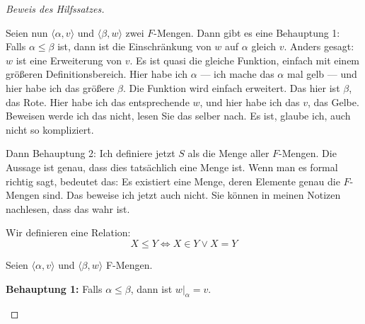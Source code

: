 \begin{proof}[Beweis des Hilfssatzes]
\begin{spoken-clean}[00:46:55 - 00:48:30]
Seien nun $\langle \alpha, v \rangle$ und $\langle \beta, w \rangle$ zwei $F$-Mengen. Dann gibt es eine Behauptung 1: Falls $\alpha \le \beta$ ist, dann ist die Einschränkung von $w$ auf $\alpha$ gleich $v$. Anders gesagt: $w$ ist eine Erweiterung von $v$. Es ist quasi die gleiche Funktion, einfach mit einem größeren Definitionsbereich. Hier habe ich $\alpha$ --- ich mache das $\alpha$ mal gelb --- und hier habe ich das größere $\beta$. Die Funktion wird einfach erweitert. Das hier ist $\beta$, das Rote. Hier habe ich das entsprechende $w$, und hier habe ich das $v$, das Gelbe. Beweisen werde ich das nicht, lesen Sie das selber nach. Es ist, glaube ich, auch nicht so kompliziert.
\end{spoken-clean}

\begin{spoken-clean}[00:48:30 - 00:49:40]
Dann Behauptung 2: Ich definiere jetzt $S$ als die Menge aller $F$-Mengen. Die Aussage ist genau, dass dies tatsächlich eine Menge ist. Wenn man es formal richtig sagt, bedeutet das: Es existiert eine Menge, deren Elemente genau die $F$-Mengen sind. Das beweise ich jetzt auch nicht. Sie können in meinen Notizen nachlesen, dass das wahr ist.
\end{spoken-clean}

\begin{math-stroke}
Wir definieren eine Relation:
\[
X \le Y \iff X \in Y \lor X = Y
\]

Seien $\langle \alpha, v \rangle$ und $\langle \beta, w \rangle$ F-Mengen.

\textbf{Behauptung 1:} Falls $\alpha \le \beta$, dann ist $w|_\alpha = v$.

\begin{center}
\end{center}
\end{math-stroke}
\end{proof}
